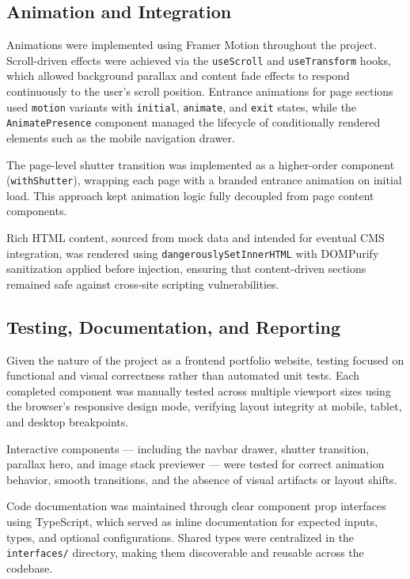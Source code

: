 \documentclass[12pt, oneside, a4paper]{book}
\begin{document}
\begin{doublespace}
\subsection{Animation and Integration}

Animations were implemented using Framer Motion throughout the project. Scroll-driven
effects were achieved via the \texttt{useScroll} and \texttt{useTransform} hooks, which
allowed background parallax and content fade effects to respond continuously to the
user's scroll position. Entrance animations for page sections used \texttt{motion}
variants with \texttt{initial}, \texttt{animate}, and \texttt{exit} states, while the
\texttt{AnimatePresence} component managed the lifecycle of conditionally rendered
elements such as the mobile navigation drawer.

The page-level shutter transition was implemented as a higher-order component
(\texttt{withShutter}), wrapping each page with a branded entrance animation on
initial load. This approach kept animation logic fully decoupled from page content
components.

Rich HTML content, sourced from mock data and intended for eventual CMS integration,
was rendered using \texttt{dangerouslySetInnerHTML} with DOMPurify sanitization applied
before injection, ensuring that content-driven sections remained safe against
cross-site scripting vulnerabilities.

\subsection{Testing, Documentation, and Reporting}

Given the nature of the project as a frontend portfolio website, testing focused on
functional and visual correctness rather than automated unit tests. Each completed
component was manually tested across multiple viewport sizes using the browser's
responsive design mode, verifying layout integrity at mobile, tablet, and desktop
breakpoints.

Interactive components --- including the navbar drawer, shutter transition, parallax
hero, and image stack previewer --- were tested for correct animation behavior, smooth
transitions, and the absence of visual artifacts or layout shifts.

Code documentation was maintained through clear component prop interfaces using
TypeScript, which served as inline documentation for expected inputs, types, and
optional configurations. Shared types were centralized in the \texttt{interfaces/}
directory, making them discoverable and reusable across the codebase.


\end{doublespace}
\end{document}
